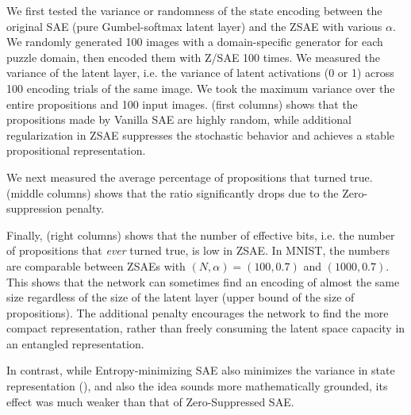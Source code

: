 We first tested the variance or randomness of the state encoding between
the original SAE (pure Gumbel-softmax latent layer) and the ZSAE with various $\alpha$.
We randomly generated 100 images with a domain-specific generator for each puzzle domain,
then encoded them with Z/SAE 100 times.
We measured the variance of the latent layer, i.e. the variance of latent activations (0 or 1)
across 100 encoding trials of the same image.
We took the maximum variance over the entire propositions and 100 input images.
 (first columns) shows that the propositions made by Vanilla SAE are highly random,
while additional regularization in ZSAE suppresses the stochastic behavior
and achieves a stable propositional representation.

We next measured the average percentage of propositions that turned true.
 (middle columns) shows that the ratio significantly drops due to the Zero-suppression penalty.

Finally,  (right columns) shows that the number of effective bits,
i.e. the number of propositions that \emph{ever} turned true, is low in ZSAE.
In MNIST, the numbers are comparable between ZSAEs with $(N,\alpha)=(100,0.7)$ and $(1000,0.7)$.
This shows that the network can sometimes find an encoding of almost the same size
regardless of the size of the latent layer (upper bound of the size of
propositions). The additional
penalty encourages the network to find the more compact representation,
rather than freely consuming the latent space capacity in an entangled representation.


In contrast, while Entropy-minimizing SAE also minimizes the variance in state representation
(),
and also the idea sounds more mathematically grounded,
its effect was much weaker than that of Zero-Suppressed SAE.

